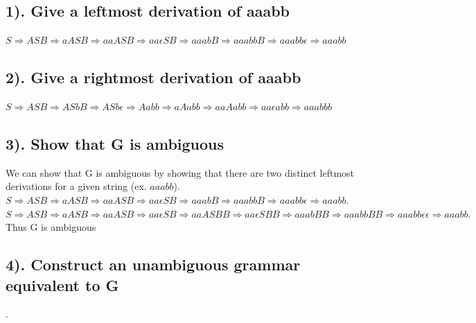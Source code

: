 \documentclass[20pt]{article} %
\begin{document}
\subsection{1). Give a leftmost derivation of aaabb}
$S \Rightarrow ASB \Rightarrow aASB \Rightarrow aaASB \Rightarrow aa\epsilon SB \Rightarrow aaabB \Rightarrow aaabbB \Rightarrow aaabb\epsilon \Rightarrow aaabb$
\subsection{2). Give a rightmost derivation of aaabb}
$S \Rightarrow ASB \Rightarrow ASbB \Rightarrow ASb\epsilon \Rightarrow Aabb \Rightarrow aAabb \Rightarrow aaAabb \Rightarrow aa\epsilon abb \Rightarrow aaabbb$
\subsection{3). Show that G is ambiguous}
We can show that G is ambiguous by showing that there are two distinct leftmost derivations for a given string (ex. $aaabb$).  \\



$S \Rightarrow ASB \Rightarrow aASB \Rightarrow aaASB \Rightarrow aa\epsilon SB \Rightarrow aaabB \Rightarrow aaabbB \Rightarrow aaabb\epsilon \Rightarrow aaabb$. \\


$S \Rightarrow ASB \Rightarrow aASB \Rightarrow aaASB \Rightarrow aa\epsilon SB \Rightarrow aaASBB \Rightarrow aa\epsilon SBB \Rightarrow aaabBB \Rightarrow aaabbBB \Rightarrow aaabb\epsilon \epsilon \Rightarrow aaabb.$ \\

Thus G is ambiguous

\subsection{4). Construct an unambiguous grammar equivalent to G}.
\end{document}
